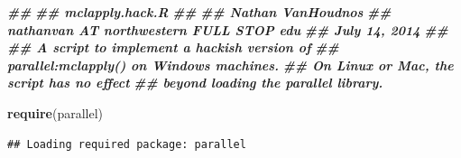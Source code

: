 \documentclass[
  12pt,
  american,
  a4paper,
  extrafontsizes,onecolumn,openright
  ]{memoir}
\newenvironment{Shaded}{\begin{snugshade}}{\end{snugshade}}
\newcommand{\DocumentationTok}[1]{\textcolor[rgb]{0.56,0.35,0.01}{\textbf{\textit{#1}}}}
\newcommand{\FunctionTok}[1]{\textcolor[rgb]{0.13,0.29,0.53}{\textbf{#1}}}
\newcommand{\NormalTok}[1]{#1}
\begin{document}
\scriptsize

\begin{Shaded}
\begin{Highlighting}[]
\DocumentationTok{\#\#}
\DocumentationTok{\#\# mclapply.hack.R}
\DocumentationTok{\#\#}
\DocumentationTok{\#\# Nathan VanHoudnos}
\DocumentationTok{\#\# nathanvan AT northwestern FULL STOP edu}
\DocumentationTok{\#\# July 14, 2014}
\DocumentationTok{\#\#}
\DocumentationTok{\#\# A script to implement a hackish version of }
\DocumentationTok{\#\# parallel:mclapply() on Windows machines.}
\DocumentationTok{\#\# On Linux or Mac, the script has no effect}
\DocumentationTok{\#\# beyond loading the parallel library. }

\FunctionTok{require}\NormalTok{(parallel)    }
\end{Highlighting}
\end{Shaded}

\begin{verbatim}
## Loading required package: parallel
\end{verbatim}
\end{document}
